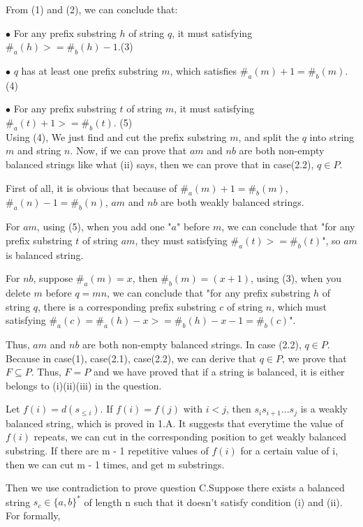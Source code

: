 \documentclass[12pt,a4paper]{article}
\newcommand{\question}[1]{\bigskip\noindent{\textbf{Q{#1} solution}}}
\begin{document}
From (1) and (2), we can conclude that:


$\bullet$ For any prefix substring $h$ of string $q$, it must satisfying $\#_{a}(h) >= \#_{b}(h) -1$.(3)


$\bullet$ $q$ has at least one prefix substring $m$, which satisfies $\#_{a}(m) + 1= \#_{b}(m)$. (4)


$\bullet$ For any prefix substring $t$ of string $m$, it must satisfying $\#_{a}(t) + 1>= \#_{b}(t)$. (5)\\


Using (4), We just find and cut the prefix substring $m$, and split the $q$ into string $m$ and string $n$. Now, if we can prove that $am$ and $nb$ are both non-empty balanced strings like what (ii) says, then we can prove that in case(2.2), $q \in P$.


First of all, it is obvious that because of $\#_{a}(m) + 1= \#_{b}(m)$, $\#_{a}(n) - 1= \#_{b}(n)$, $am$ and $nb$ are both weakly balanced strings. 


For $am$, using (5), when you add one "$a$" before $m$, we can conclude that "for any prefix substring $t$ of string $am$, they must satisfying $\#_{a}(t) >= \#_{b}(t)$", so $am$ is balanced string. 


For $nb$, suppose $\#_{a}(m)=x$, then $\#_{b}(m)=(x+1)$, using (3), when you delete $m$ before $q=mn$, we can conclude that "for any prefix substring $h$ of string $q$, there is a corresponding prefix substring $c$ of string $n$, which must satisfying $\#_{a}(c)= \#_{a}(h)- x >= \#_{b}(h) -x - 1 = \#_{b}(c)$".


Thus, $am$ and $nb$ are both non-empty balanced strings. In case (2.2), $q \in P$. Because in case(1), case(2.1), case(2.2), we can derive that $q \in P$, we prove that $F\subseteq P$. Thus, $F=P$ and we have proved that if a string is balanced, it is either belongs to (i)(ii)(iii) in the question.


\question{1.C}

Let $f(i) = d(s_{\le i})$. If $f(i) = f(j)$ with $ i < j$, then $s_is_{i+1}...s_{j}$ is a weakly balanced string, which is proved in 1.A. It suggests that everytime the value of $f(i)$ repeats, we can cut in the corresponding position to get weakly balanced substring. If there are m - 1 repetitive values of $f(i)$ for a certain value of i, then we can cut m - 1 times, and get m substrings.

Then we use contradiction to prove question C.Suppose there exists a balanced string $s_c \in \{a,b\}^*$ of length n such that it doesn't satisfy condition (i) and (ii). For formally,
\end{document}

